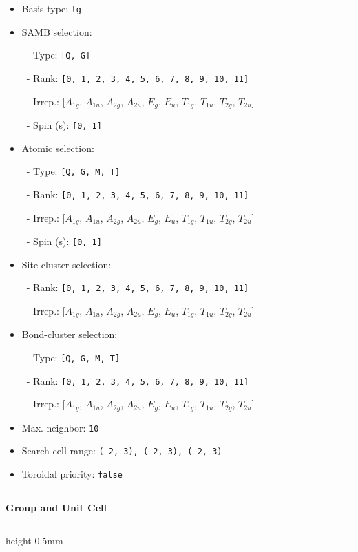 \documentclass[fleqn,10pt,landscape]{jsarticle}
\begin{document}
\begin{itemize}
\item Basis type: \texttt{lg}

\item SAMB selection:

\, - Type: \texttt{[Q, G]}

\, - Rank: \texttt{[0, 1, 2, 3, 4, 5, 6, 7, 8, 9, 10, 11]}

\, - Irrep.: [$A_{1g}$, $A_{1u}$, $A_{2g}$, $A_{2u}$, $E_{g}$, $E_{u}$, $T_{1g}$, $T_{1u}$, $T_{2g}$, $T_{2u}$]

\, - Spin (s): \texttt{[0, 1]}

\item Atomic selection:

\, - Type: \texttt{[Q, G, M, T]}

\, - Rank: \texttt{[0, 1, 2, 3, 4, 5, 6, 7, 8, 9, 10, 11]}

\, - Irrep.: [$A_{1g}$, $A_{1u}$, $A_{2g}$, $A_{2u}$, $E_{g}$, $E_{u}$, $T_{1g}$, $T_{1u}$, $T_{2g}$, $T_{2u}$]

\, - Spin (s): \texttt{[0, 1]}

\item Site-cluster selection:

\, - Rank: \texttt{[0, 1, 2, 3, 4, 5, 6, 7, 8, 9, 10, 11]}

\, - Irrep.: [$A_{1g}$, $A_{1u}$, $A_{2g}$, $A_{2u}$, $E_{g}$, $E_{u}$, $T_{1g}$, $T_{1u}$, $T_{2g}$, $T_{2u}$]

\item Bond-cluster selection:

\, - Type: \texttt{[Q, G, M, T]}

\, - Rank: \texttt{[0, 1, 2, 3, 4, 5, 6, 7, 8, 9, 10, 11]}

\, - Irrep.: [$A_{1g}$, $A_{1u}$, $A_{2g}$, $A_{2u}$, $E_{g}$, $E_{u}$, $T_{1g}$, $T_{1u}$, $T_{2g}$, $T_{2u}$]

\item Max. neighbor: \texttt{10}

\item Search cell range: \texttt{(-2, 3), (-2, 3), (-2, 3)}

\item Toroidal priority: \texttt{false}

\end{itemize}
\vspace{5mm}
\noindent \rule[0.5mm]{5mm}{0.5mm}\hspace{3mm}\textbf{Group and Unit Cell}\hspace{3mm}\leaders\hrule height 0.5mm\hfill\kern0pt
\vspace{3mm}
\end{document}
